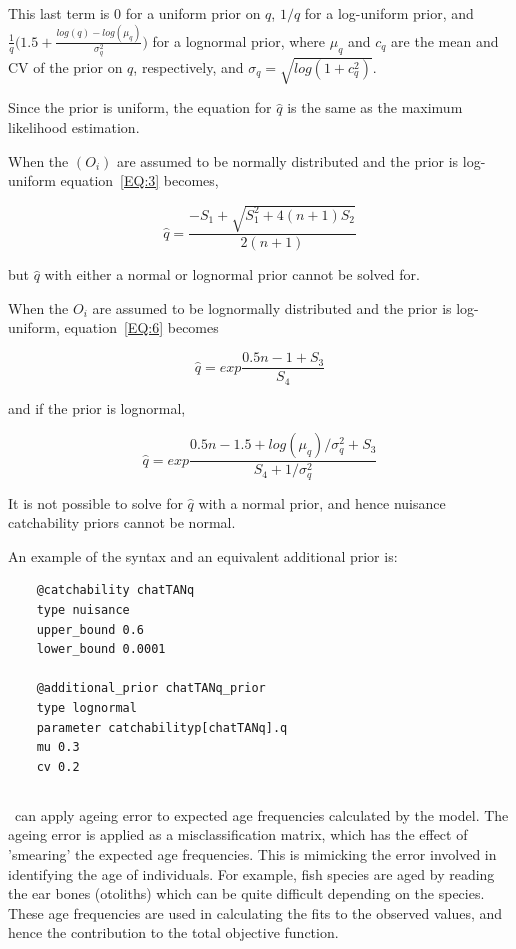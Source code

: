 This last term is $0$ for a uniform prior on $q$, $1/q$ for a log-uniform prior, and $\frac{1}{q}\bigg( 1.5 + \frac{log(q) - log(\mu_q)}{\sigma_q^2} \bigg)$ for a lognormal prior, where $\mu_q$ and $c_q$ are the mean and CV of the prior on $q$, respectively, and $\sigma_q = \sqrt{log(1+c_q^2)}$. 

Since the prior is uniform, the equation for $\hat q$ is the same as the maximum likelihood estimation.

When the $(O_i)$ are assumed to be normally distributed and the prior is log-uniform equation~\eqref{EQ:3} becomes,

\begin{equation}\label{EQ:7}
	\hat q = \frac{-S_1 + \sqrt{S_1^2 + 4(n + 1)S_2}}{2(n+1)}
\end{equation}

but $\hat q$ with either a normal or lognormal prior cannot be solved for.

When the $O_i$ are assumed to be lognormally distributed and the prior is log-uniform, equation~\eqref{EQ:6} becomes

\begin{equation}\label{EQ:8}
	\hat q = exp\frac{0.5n -1 + S_3}{S_4}
\end{equation}

and if the prior is lognormal,

\begin{equation}\label{EQ:9}
	\hat q = exp\frac{0.5n -1.5 + log(\mu_q)/\sigma_q^2 + S_3}{S_4 + 1 / \sigma_q^2}
\end{equation}

It is not possible to solve for $\hat q$ with a normal prior, and hence nuisance catchability priors cannot be normal.

An example of the syntax and an equivalent additional prior is:

{\small{\begin{verbatim}
	@catchability chatTANq
	type nuisance
	upper_bound 0.6
	lower_bound 0.0001

	@additional_prior chatTANq_prior
	type lognormal
	parameter catchabilityp[chatTANq].q
	mu 0.3
	cv 0.2
\end{verbatim}}}

\ifAgeBased
\subsection{}\label{sec:AgeingError}

\CNAME\ can apply ageing error to expected age frequencies calculated by the model. The ageing error is applied as a misclassification matrix, which has the effect of 'smearing' the expected age frequencies. This is mimicking the error involved in identifying the age of individuals. For example, fish species are aged by reading the ear bones (otoliths) which can be quite difficult depending on the species. These age frequencies are used in calculating the fits to the observed values, and hence the contribution to the total objective function.

